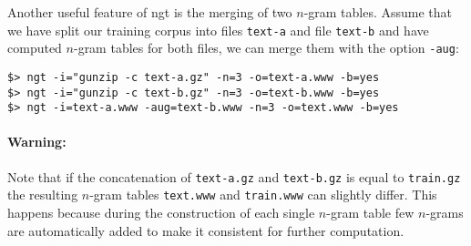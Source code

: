 \noindent
Another useful feature of ngt is the merging of two $n$-gram tables. Assume that we have 
split our training corpus into files  {\tt text-a} and file {\tt text-b} and have computed $n$-gram 
tables for both files, we can merge them with the option {\tt -aug}:
\begin{verbatim}
$> ngt -i="gunzip -c text-a.gz" -n=3 -o=text-a.www -b=yes
$> ngt -i="gunzip -c text-b.gz" -n=3 -o=text-b.www -b=yes
$> ngt -i=text-a.www -aug=text-b.www -n=3 -o=text.www -b=yes
\end{verbatim}

\paragraph{Warning:} Note that if the concatenation of {\tt text-a.gz} and {\tt text-b.gz} is equal to {\tt train.gz} the resulting $n$-gram tables
{\tt text.www} and {\tt train.www} can slightly differ. This happens because during the construction of each single $n$-gram table few $n$-grams are automatically added to make it consistent for further computation.


